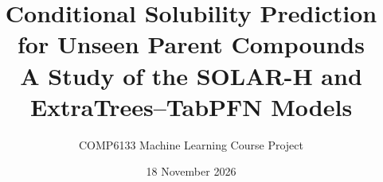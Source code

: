 \documentclass{assignment}
\title{Conditional Solubility Prediction for Unseen Parent Compounds\\A Study of the SOLAR-H and ExtraTrees--TabPFN Models}
\author{COMP6133 Machine Learning Course Project}
\date{18 November 2026}
\begin{document}
\maketitle
\setcounter{tocdepth}{2}
\tableofcontents
\clearpage













\FloatBarrier
\newcommand{\BIBdecl}{\fontsize{10}{13}\selectfont\setlength{\itemsep}{0.1em}\setlength{\parsep}{0pt}}


\end{document}
